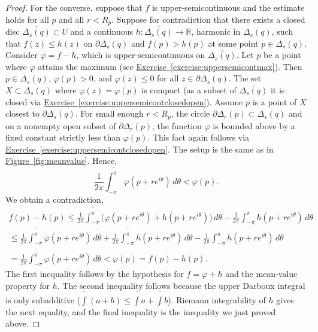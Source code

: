 \documentclass[12pt,openany]{book}
\newcommand{\R}{{\mathbb{R}}}
\theoremstyle{plain}
\theoremstyle{remark}
\theoremstyle{definition}
\theoremstyle{exercise}
\theoremstyle{example}
\newcommand{\figureref}[1]{\hyperref[#1]{Figure~\ref*{#1}}}
\newcommand{\exerciseref}[1]{\hyperref[#1]{Exercise~\ref*{#1}}}
\begin{document}
\begin{proof}
For the converse,
suppose that $f$ is upper-semicontinuous and
the estimate holds for all $p$ and all $r < R_p$.
Suppose for contradiction that
there exists a closed disc 
$\overline{\Delta_s(q)} \subset U$ and a continuous
$h \colon \overline{\Delta_s(q)} \to \R$, harmonic in $\Delta_s(q)$,
such that $f(z) \leq h(z)$ on $\partial \Delta_s(q)$ and
$f(p) > h(p)$ at some point $p \in \Delta_s(q)$.
Consider $\varphi = f-h$, which is upper-semicontinuous
on $\overline{\Delta_s(q)}$.
Let $p$ be a point where $\varphi$ attains the maximum 
(see \exerciseref{exercise:uppersemicontmax}).
Then $p \in \Delta_s(q)$,
$\varphi(p) > 0$, and $\varphi(z) \leq 0$
for all $z \in \partial \Delta_s(q)$.  The set
$X \subset \Delta_s(q)$ where $\varphi(z) = \varphi(p)$ is compact
(as a subset of $\overline{\Delta_s(q)}$ it is closed via
\exerciseref{exercise:uppersemicontclosedopen}).
Assume $p$ is a point of $X$ closest to
$\partial \Delta_s(q)$.
For small enough $r < R_p$, the circle
$\partial \Delta_r(p) \subset \Delta_s(q)$ and on a nonempty open subset
of $\partial \Delta_r(p)$, the function $\varphi$ is bounded above by
a fixed constant strictly less than $\varphi(p)$.
This fact again follows via 
\exerciseref{exercise:uppersemicontclosedopen}.
The setup is the same as in \figureref{fig:meanvalue}.  Hence,
\begin{equation*}
\frac{1}{2\pi} \overline{\int_{-\pi}^{\pi}} \varphi(p+re^{i\theta})\, d\theta <
\varphi(p) .
\end{equation*}
We obtain
a contradiction,
\begin{multline*}
f(p)-h(p)
\leq
\frac{1}{2\pi} \overline{\int_{-\pi}^{\pi}}
\bigl( \varphi(p+re^{i\theta}) +
h(p+re^{i\theta}) \bigr)
\, d\theta
-
\frac{1}{2\pi} \int_{-\pi}^{\pi} h(p+re^{i\theta}) \, d\theta
\\
\leq
\frac{1}{2\pi} \overline{\int_{-\pi}^{\pi}}
\varphi(p+re^{i\theta})
\, d\theta
+
\frac{1}{2\pi} \overline{\int_{-\pi}^{\pi}}
h(p+re^{i\theta})
\, d\theta
-
\frac{1}{2\pi} \int_{-\pi}^{\pi} h(p+re^{i\theta}) \, d\theta
\\
=
\frac{1}{2\pi} \overline{\int_{-\pi}^{\pi}} \varphi(p+re^{i\theta})\, d\theta <
\varphi(p) =
f(p)-h(p) .
\end{multline*}
The first inequality follows by the hypothesis for
$f=\varphi+h$ and the mean-value
property for $h$.  The second inequality
follows because the upper Darboux integral is
only subadditive ($\overline{\int} (a+b) \leq \overline{\int}a +
\overline{\int} b$).  Riemann integrability of $h$ gives the next
equality, and the final inequality is the inequality we just proved above.
\end{proof}
\end{document}
